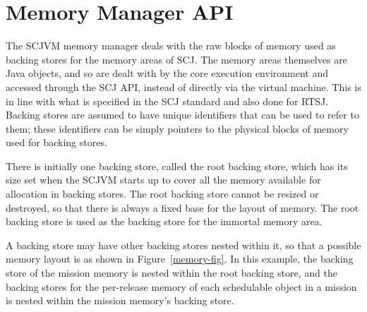 \section{Memory Manager API}
\label{memory-manager-section}

The SCJVM memory manager deals with the raw blocks of memory used as
backing stores for the memory areas of SCJ.
The memory areas themselves are Java objects, and so are dealt with by
the core execution environment and accessed through the SCJ API,
instead of directly via the virtual machine.
This is in line with what is specified in the SCJ standard and also
done for RTSJ.
Backing stores are assumed to have unique identifiers that can be used
to refer to them; these identifiers can be simply pointers to the
physical blocks of memory used for backing stores.

There is initially one backing store, called the root backing store,
which has its size set when the SCJVM starts up to cover all the
memory available for allocation in backing stores.
The root backing store cannot be resized or destroyed, so that there
is always a fixed base for the layout of memory.
The root backing store is used as the backing store for the immortal
memory area.

A backing store may have other backing stores nested within it, so
that a possible memory layout is as shown in Figure~\ref{memory-fig}.
In this example, the backing store of the mission memory is nested
within the root backing store, and the backing stores for the
per-release memory of each schedulable object in a mission is nested
within the mission memory's backing store.

\begin{figure*}[ht]
  \centering
  \caption{An example memory layout}
  \label{memory-fig}
\end{figure*}


